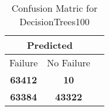 \begin{table}[] 
\caption{Confusion Matric for DecisionTrees100} 
\label{Table: Prediction Accuracy-NoneDecisionTrees100SVMEKF-ignoresolarPanelDipole100.9EKF-top2-solarPanelDipole} 
\centering 
\begin{tabular} 
 {@{}ccc@{}} 
\toprule 
\multicolumn{2}{c}{\textbf{Predicted}}
 \\ \midrule 
\multicolumn{1}{|c|}{Failure} & 
\multicolumn{1}{c|}{No Failure}
 \\ \midrule 
\multicolumn{1}{|c|}{\color{green}\textbf{63412}} & 
\multicolumn{1}{c|}{\color{red}\textbf{10}}
 \\ \midrule 
\multicolumn{1}{|c|}{\color{red}\textbf{63384}} & 
\multicolumn{1}{c|}{\color{green}\textbf{43322}}
 \\ \bottomrule 
\end{tabular} 
\end{table} 
